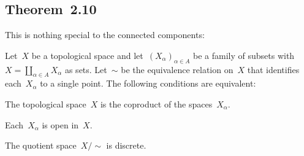 \subsection{Theorem~2.10}

This is nothing special to the connected components:

\begin{proposition}
	Let~$X$ be a topological space and let~$(X_α)_{α ∈ A}$ be a family of subsets with~$X = ∐_{α ∈ A} X_α$ as sets.
	Let~$∼$ be the equivalence relation on~$X$ that identifies each~$X_α$ to a single point.
	The following conditions are equivalent:
	\begin{equivalenceslist}

		\item
			\label{is coproduct}
			The topological space~$X$ is the coproduct of the spaces~$X_α$.

		\item
			\label{each subspace is open}
			Each~$X_α$ is open in~$X$.

		\item
			\label{quotient space is discrete}
			The quotient space~$X / {∼}$ is discrete.

	\end{equivalenceslist}
\end{proposition}

